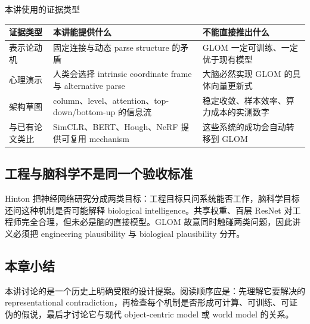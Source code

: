 \begin{knowledgebox}{本讲使用的证据类型}
\begin{tabularx}{\textwidth}{L{0.22\textwidth}L{0.31\textwidth}>{\raggedright\arraybackslash}X}
\toprule
证据类型 & 本讲能提供什么 & 不能直接推出什么 \\
\midrule
表示论动机 & 固定连接与动态 parse structure 的矛盾 & GLOM 一定可训练、一定优于现有模型 \\
心理演示 & 人类会选择 intrinsic coordinate frame 与 alternative parse & 大脑必然实现 GLOM 的具体向量更新式 \\
架构草图 & column、level、attention、top-down/bottom-up 的信息流 & 稳定收敛、样本效率、算力成本的实测数字 \\
与已有论文类比 & SimCLR、BERT、Hough、NeRF 提供可复用 mechanism & 这些系统的成功会自动转移到 GLOM \\
\bottomrule
\end{tabularx}
\end{knowledgebox}

\subsection{工程与脑科学不是同一个验收标准}

Hinton 把神经网络研究分成两类目标：工程目标只问系统能否工作，脑科学目标还问这种机制是否可能解释 biological intelligence。共享权重、百层 ResNet 对工程师完全合理，但未必是脑的直接模型。GLOM 故意同时触碰两类问题，因此讲义必须把 engineering plausibility 与 biological plausibility 分开。



\subsection{本章小结}

本讲讨论的是一个历史上明确受限的设计提案。阅读顺序应是：先理解它要解决的 representational contradiction，再检查每个机制是否形成可计算、可训练、可证伪的假说，最后才讨论它与现代 object-centric model 或 world model 的关系。

